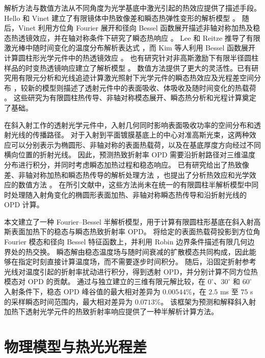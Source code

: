 \documentclass{optica-article}
\begin{document}
解析方法与数值方法从不同角度为光学基底中激光引起的热效应提供了描述手段。
Hello 和 Vinet 建立了有限镜体中热致像差和瞬态热弹性变形的解析模型 \cite{hellovinet1990,hellovinet1990transient}。
随后，Vinet 利用方位角 Fourier 展开和径向 Bessel 函数展开描述非轴对称加热及稳态热透镜效应，并在轴对称条件下研究了瞬态热响应 \cite{vinet2009}。
Lee 和 Reitze 推导了有限激光棒中随时间变化的温度分布解析表达式 \cite{lee2015}，而 Kim 等人利用 Bessel 函数展开计算圆柱形光学元件中的热透镜效应 \cite{kim2017}。
也有研究针对非高斯激励下有限半径圆柱样品的时变热透镜响应建立了解析模型 \cite{sabaeian2016}。
数值方法提供了更大的灵活性。已有研究用有限元分析和光线追迹计算激光照射下光学元件的瞬态热效应及光程差空间分布 \cite{borik1991}，较新的模型则描述了透射元件中的表面吸收、体吸收及随时间变化的热载荷 \cite{kurcsics2025}。
这些研究为有限圆柱热传导、非轴对称模态展开、瞬态热分析和光程计算奠定了基础。

在斜入射工作的透射光学元件中，入射几何同时影响表面吸收功率的空间分布和透射光线的传播路径。
对于入射到平面镀膜基底上的中心对准高斯光束，这两种效应可以分别表示为椭圆形、非轴对称的表面热载荷，以及在基底厚度方向经过不同横向位置的折射光线。
因此，预测热致折射率 OPD 需要沿折射路径对三维温度分布进行积分，并同时考虑瞬态加热过程和稳态响应。
已有研究给出了热致像差、非轴对称加热和瞬态热传导的解析处理方法 \cite{hellovinet1990,vinet2009,lee2015,kim2017,hellovinet1990transient,sabaeian2016}，也提出了分析热效应和光学效应的数值方法 \cite{kurcsics2025,borik1991}。
在所引文献中，这些方法尚未在统一的有限圆柱半解析模型中同时处理随入射角变化的椭圆形表面加热、非轴对称瞬态热传导和沿折射光线的 OPD 计算。

本文建立了一种 Fourier--Bessel 半解析模型，用于计算有限圆柱形基底在斜入射高斯表面加热下的稳态与瞬态热致折射率 OPD。
将给定的表面热载荷投影到方位角 Fourier 模态和径向 Bessel 特征函数上，并利用 Robin 边界条件描述有限几何边界处的热交换。
瞬态解由稳态温度场与随时间衰减的扩散模态共同构成，因此能够在指定时刻直接计算温度场，而不需要逐步时间积分。
随后，沿固定折射参考光线对温度引起的折射率扰动进行积分，得到透射 OPD，并分别计算不同方位热模态对 OPD 的贡献。
通过与独立建立的三维有限元解比较，在 $0^\circ$、$30^\circ$ 和 $60^\circ$ 入射条件下，稳态 OPD 峰谷值的最大相对差异为 $0.00544\%$，在 $2.5$ ms 至 $75$ s 的采样瞬态时间范围内，最大相对差异为 $0.0713\%$。
该框架为预测和解释斜入射加热下透射光学元件的热致折射率响应提供了一种半解析计算方法。

\section{物理模型与热光光程差}
\end{document}
